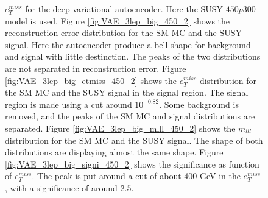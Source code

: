 \begin{figure}[H]
{    $e_T^{miss}$ for the deep variational autoencoder. Here the SUSY $450p300$ model is used.
    Figure \ref{fig:VAE_3lep_big_450_2} shows the reconstruction error 
    distribution for the SM MC and the SUSY signal. Here the autoencoder produce a bell-shape for background and 
    signal with little destinction. The peaks of the two distributions are not separated in reconstruction error. Figure \ref{fig:VAE_3lep_big_etmiss_450_2} 
    shows the $e_T^{miss}$ distribution for the SM MC and the SUSY signal in the signal region. 
    The signal region is made using a cut around $10^{-0.82}$. Some background is removed, and the peaks of the SM MC and signal 
    distributions are separated. Figure \ref{fig:VAE_3lep_big_mlll_450_2} shows the $m_{lll}$ distribution for the SM MC and the SUSY signal. 
    The shape of both distributions are displaying almost the same shape. Figure \ref{fig:VAE_3lep_big_signi_450_2} shows the significance as 
    function of $e_T^{miss}$. The peak is put around a cut of about 400 GeV in the $e_T^{miss}$, with a significance of around $2.5$.}
    \label{fig:VAE_3lep_big_rec_sig_signi_450_2}
\end{figure}

